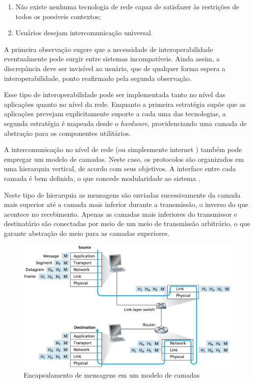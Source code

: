 \begin{enumerate}
  \item{Não existe nenhuma tecnologia de rede capaz de satisfazer às restrições de
        todos os possíveis contextos;}
  \item{Usuários desejam intercomunicação universal.}
\end{enumerate}

A primeira observação sugere que a necessidade de interoperabilidade eventualmente
pode surgir entre sistemas incompatíveis. Ainda assim, a discrepância deve ser
invisível ao usuário, que de qualquer forma espera a interoperabilidade, ponto
reafirmado pela segunda observação.

Esse tipo de interoperabilidade pode ser implementada tanto no nível das aplicações
quanto no nível da rede. Enquanto a primeira estratégia supõe que as aplicações
prevejam explicitamente suporte a cada uma das tecnologias, a segunda estratégia
é mapeada desde o \textit{hardware}, providenciando uma camada de abstração para os
componentes utilitários.

A intercomunicação no nível de rede (ou simplesmente internet \cite{comer2000})
também pode empregar um modelo de camadas. Neste caso, os protocolos são organizados
em uma hierarquia vertical, de acordo com seus objetivos. A interface entre cada
camada é bem definida, o que concede modularidade ao sistema \cite{kurose2012}.

Neste tipo de hierarquia as mensagens são enviadas sucessivamente da camada mais
superior até a camada mais inferior durante a transmissão, o inverso do que acontece
no recebimento. Apenas as camadas mais inferiores do transmissor e destinatário são
conectadas por meio de um meio de transmissão arbitrário, o que garante abstração do
meio para as camadas superiores.

\begin{figure}[h]
	\centering
		\includegraphics[keepaspectratio=true,scale=0.6]{figuras/encapsulamento.eps}
	\caption[Encapsulamento de mensagens entre camadas \cite{kurose2012}]
          {Encapsulamento de mensagens em um modelo de camadas \cite{kurose2012}}
	\label{fig:encapsulamento}
\end{figure}

